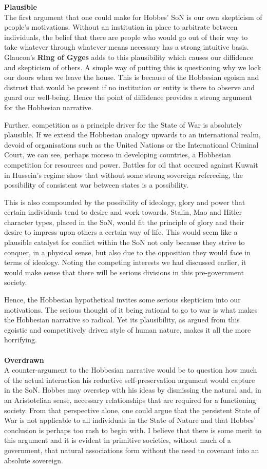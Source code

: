 \documentclass[12pt, letterpaper]{article}
\begin{document}
\textbf{Plausible}\\
The first argument that one could make for Hobbes' SoN is our own skepticism of people's motivations. Without an institution in place to arbitrate between individuals, the belief that there are people who would go out of their way to take whatever through whatever means necessary has a strong intuitive basis. Glaucon's \textbf{Ring of Gyges} adds to this plausibility which causes our diffidence and skepticism of others. A simple way of putting this is questioning why we lock our doors when we leave the house. This is because of the Hobbesian egoism and distrust that would be present if no institution or entity is there to observe and guard our well-being. Hence the point of diffidence provides a strong argument for the Hobbesian narrative.

Further, competition as a principle driver for the State of War is absolutely plausible. If we extend the Hobbesian analogy upwards to an international realm, devoid of organisations such as the United Nations or the International Criminal Court, we can see, perhaps moreso in developing countries, a Hobbesian competition for resources and power. Battles for oil that occured against Kuwait in Hussein's regime show that without some strong sovereign refereeing, the possibility of consistent war between states is a possibility.

This is also compounded by the possibility of ideology, glory and power that certain individuals tend to desire and work towards. Stalin, Mao and Hitler character types, placed in the SoN, would fit the principle of glory and their desire to impress upon others a certain way of life. This would seem like a plausible catalyst for conflict within the SoN not only because they strive to conquer, in a physical sense, but also due to the opposition they would face in terms of ideology. Noting the competing interests we had discussed earlier, it would make sense that there will be serious divisions in this pre-government society.

Hence, the Hobbesian hypothetical invites some serious skepticism into our motivations. The serious thought of it being rational to go to war is what makes the Hobbesian narrative so radical. Yet its plausibility, as argued from this egoistic and competitively driven style of human nature, makes it all the more horrifying.
\\\\
\textbf{Overdrawn}\\
A counter-argument to the Hobbesian narrative would be to question how much of the actual interaction his reductive self-preservation argument would capture in the SoN. Hobbes may overstep with his ideas by dismissing the natural and, in an Aristotelian sense, necessary relationships that are required for a functioning society. From that perspective alone, one could argue that the persistent State of War is not applicable to all individuals in the State of Nature and that Hobbes' conclusion is perhaps too rash to begin with. I believe that there is some merit to this argument and it is evident in primitive societies, without much of a government, that natural associations form without the need to covenant into an absolute sovereign. 
\end{document}
